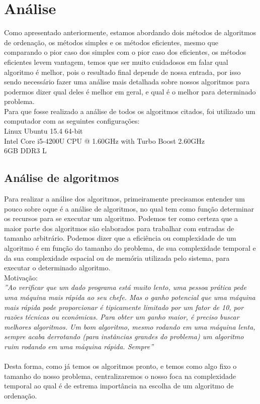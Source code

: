 \documentclass[
	12pt,				%
	oneside,			%
	a4paper,			%
	english,			%
	brazil,				%
	]{article}
\begin{document}
\section{Análise}
Como apresentado anteriormente, estamos abordando dois métodos de algoritmos de ordenação, os métodos simples e os métodos eficientes, mesmo que comparando 
o pior caso dos simples com o pior caso dos eficientes, os métodos eficientes levem vantagem, temos que ser muito cuidadosos em falar qual algoritmo é melhor,
pois o resultado final depende de nossa entrada, por isso sendo necessário fazer uma análise mais detalhada sobre nossos algoritmos para 
podermos dizer qual deles é melhor em geral, e qual é o melhor para determinado problema.
\\Para que fosse realizado a análise de todos os algoritmos citados, foi utilizado um computador com as seguintes configurações:\\
\indent Linux Ubuntu 15.4 64-bit \\
\indent Intel Core i5-4200U CPU @ 1.60GHz with Turbo Boost 2.60GHz \\
\indent 6GB DDR3 L

\subsection{Análise de algoritmos}
Para realizar a análise dos algoritmos, primeiramente precisamos entender um pouco sobre oque é a análise de algoritmos, no qual tem como função determinar os
recursos para se executar um algoritmo. Podemos ter como certeza que a maior parte dos algoritmos são elaborados para trabalhar com entradas de tamanho arbitrário. Podemos 
dizer que a eficiência ou complexidade de um algoritmo é em função do tamanho do problema, de sua complexidade temporal e da sua complexidade espacial ou de memória
utilizada pelo sistema, para executar o determinado algoritmo. 
\\Motivação: \\ \textit{ ''Ao verificar que um dado programa está muito lento, uma pessoa prática pede uma máquina mais rápida ao seu chefe. Mas o ganho potencial que uma
máquina mais rápida pode proporcionar é tipicamente limitado por um fator de 10, por razões técnicas ou econômicas. Para obter um ganho maior, é preciso buscar 
melhores algoritmos. Um bom algoritmo, mesmo rodando em uma máquina lenta, sempre acaba derrotando (para instâncias grandes do problema) um 
algoritmo ruim rodando em uma máquina rápida. Sempre''}\\
\\ \indent Desta forma, como já temos os algoritmos pronto, e temos como algo fixo o tamanho do nosso problema, centralizaremos o nosso foca na complexidade temporal
ao qual é de estrema importância na escolha de um algoritmo de ordenação.\cite{Analisee}
\end{document}

